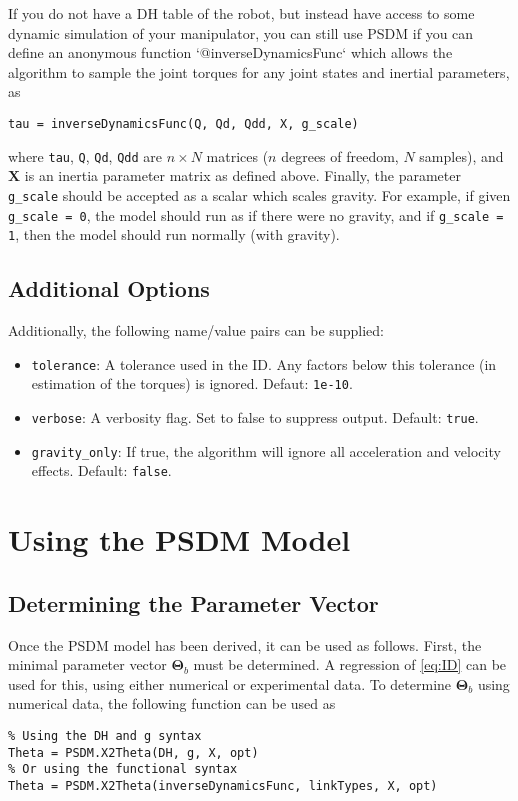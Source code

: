 \documentclass[12pt]{article}
\renewcommand{\b}[1]{\mathbf{#1}}
\begin{document}
If you do not have a DH table of the robot, but instead have access to some dynamic simulation of your manipulator, you can still use PSDM if you can define an anonymous function `@inverseDynamicsFunc` which allows the algorithm to sample the joint torques for any joint states and inertial parameters, as
\begin{lstlisting}
tau = inverseDynamicsFunc(Q, Qd, Qdd, X, g_scale)
\end{lstlisting}\vspace{1em}
where \texttt{tau}, \texttt{Q}, \texttt{Qd}, \texttt{Qdd} are $n \times N$ matrices ($n$ degrees of freedom, $N$ samples), and $\mathbf{X}$ is an inertia parameter matrix as defined above. Finally, the parameter \texttt{g\_scale} should be accepted as a scalar which scales gravity. For example, if given \texttt{g\_scale = 0}, the model should run as if there were no gravity, and if \texttt{g\_scale = 1}, then the model should run normally (with gravity).

\subsection{Additional Options}

Additionally, the following name/value pairs can be supplied:
\begin{itemize}[itemsep=0pt]
	\item \texttt{tolerance}: A tolerance used in the ID. Any factors below this tolerance (in estimation of the torques) is ignored. Defaut: \texttt{1e-10}.
	\item \texttt{verbose}: A verbosity flag. Set to false to suppress output. Default: \texttt{true}.
	\item \texttt{gravity\_only}: If true, the algorithm will ignore all acceleration  and velocity effects. Default: \texttt{false}.
\end{itemize}

\section{Using the PSDM Model}

\subsection{Determining the Parameter Vector}

Once the PSDM model has been derived, it can be used as follows. First, the minimal parameter vector $\b{\Theta}_b$ must be determined. A regression of \cref{eq:ID} can be used for this, using either numerical or experimental data. To determine $\b{\Theta}_b$ using numerical data, the following function can be used as
\begin{lstlisting}
% Using the DH and g syntax
Theta = PSDM.X2Theta(DH, g, X, opt)
% Or using the functional syntax
Theta = PSDM.X2Theta(inverseDynamicsFunc, linkTypes, X, opt)
\end{lstlisting}
\end{document}
